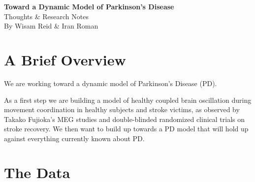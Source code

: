 \documentclass[usletter,12pt]{article} %
\newcommand{\Authors}{Wisam Reid \& Iran Roman}
\newcommand{\CompanyName}{Toward a Dynamic Model of Parkinson's Disease}
\newcommand{\SubTitle}{Thoughts \& Research Notes}
\begin{document}



\begin{center}

\vspace*{\fill} %

{\textbf{\Huge \CompanyName}}\\ [1.5cm]
{\LARGE \SubTitle}\\ [1.5cm]

By \Authors\\

\vspace*{\fill} %

\end{center}

\newpage

\tableofcontents

\newpage


\section{A Brief Overview}\label{overview}

\noindent
We are working toward a dynamic model of Parkinson’s Disease (PD).  

\noindent
As a first step we are building a model of healthy coupled brain oscillation during movement coordination in healthy subjects and stroke victims, as observed by Takako Fujioka’s MEG studies and double-blinded randomized clinical trials on stroke recovery.  We then want to build up towards a PD model that will hold up against everything currently known about PD. 



\section{The Data}
\end{document}

